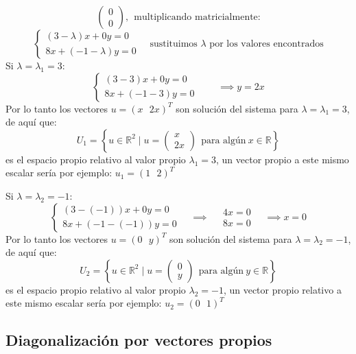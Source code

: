 \begin{enumerate}
\[\begin{pmatrix}
      0 \\ 0
    \end{pmatrix}, ~~ \text{multiplicando matricialmente:}
  \]
  \[
    \begin{cases}
      (3-\lambda)x + 0y = 0 \\
      8x + (-1-\lambda)y = 0
    \end{cases} \quad \text{sustituimos } \lambda \text{ por los valores encontrados}
  \]
  Si \(\lambda = \lambda_1 = 3\):
  \[
    \begin{cases}
      (3-3)x + 0y = 0 \\
      8x + (-1-3)y = 0
    \end{cases} \qquad \implies y = 2x
  \]
  Por lo tanto los vectores \(u = (x ~~~ 2x)^T\) son solución del sistema para \(\lambda = \lambda_1 = 3\), de aquí que:
  \[
    U_1 = \left\{u \in \mathbb{R}^2 \mid u = \begin{pmatrix}
      x \\ 2x
    \end{pmatrix} ~~ \text{para algún} ~ x \in \mathbb{R}\right\}
  \]
  es el espacio propio relativo al valor propio \(\lambda_1 = 3\), un vector propio a este mismo escalar sería por ejemplo: \(u_1 = (1 ~~~ 2)^T\)

  Si \(\lambda = \lambda_2 = -1\):
  \[
    \begin{cases}
      (3-(-1))x + 0y = 0 \\
      8x + (-1-(-1))y = 0
    \end{cases} \quad \implies\quad \begin{array}{c}
      4x = 0 \\
      8x = 0
    \end{array} \quad \implies x=0
  \]
  Por lo tanto los vectores \(u=(0 ~~~ y)^T\) son solución del sistema para \(\lambda = \lambda_2 = -1\), de aquí que:
  \[
    U_2 = \left\{u \in \mathbb{R}^2 \mid u = \begin{pmatrix}
      0 \\ y
    \end{pmatrix} ~~ \text{para algún} ~ y \in \mathbb{R}\right\}
  \]
  es el espacio propio relativo al valor propio \(\lambda_2 = -1\), un vector propio relativo a este mismo escalar sería por ejemplo: \(u_2 = (0 ~~~ 1)^T\)
\end{enumerate}

\subsection{Diagonalización por vectores propios}

